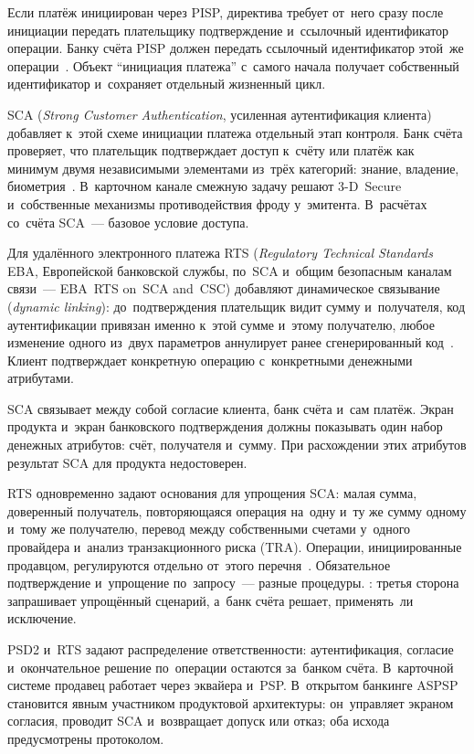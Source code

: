 Если платёж инициирован через PISP, директива требует от~него сразу после
инициации передать плательщику подтверждение и~ссылочный идентификатор операции.
Банку счёта PISP должен передать ссылочный идентификатор этой~же
операции~\cite{psd2}. Объект \enquote{инициация платежа} с~самого начала
получает собственный идентификатор и~сохраняет отдельный жизненный цикл.

SCA (\textit{Strong Customer Authentication}, усиленная аутентификация клиента)
добавляет к~этой схеме инициации платежа отдельный этап контроля. Банк
счёта проверяет, что плательщик подтверждает доступ к~счёту или платёж как
минимум двумя независимыми элементами из~трёх категорий: знание, владение,
биометрия~\cite{eba-rts-sca}. В~карточном канале смежную задачу решают
3-D~Secure и~собственные механизмы противодействия фроду у~эмитента.
В~расчётах со~счёта SCA~--- базовое условие доступа.

Для удалённого электронного платежа RTS (\textit{Regulatory Technical Standards}
  EBA, Европейской банковской службы, по~SCA и~общим безопасным каналам связи~---
EBA~RTS on~SCA and~CSC) добавляют динамическое связывание (\textit{dynamic
linking}): до~подтверждения плательщик видит сумму и~получателя,
код аутентификации привязан именно к~этой сумме и~этому получателю, любое
изменение одного из~двух параметров аннулирует ранее сгенерированный
код~\cite{eba-rts-sca}. Клиент подтверждает конкретную операцию
с~конкретными денежными атрибутами.

SCA связывает между собой согласие клиента, банк счёта и~сам платёж. Экран
продукта и~экран банковского подтверждения должны показывать один набор
денежных атрибутов: счёт, получателя и~сумму. При расхождении этих атрибутов
результат SCA для продукта недостоверен.

RTS одновременно задают основания для упрощения SCA: малая сумма, доверенный
получатель, повторяющаяся операция на~одну и~ту же сумму одному и~тому же
получателю, перевод между собственными счетами у~одного провайдера и~анализ
транзакционного риска (TRA). Операции, инициированные продавцом, регулируются
отдельно от~этого перечня~\cite{eba-rts-sca}. Обязательное подтверждение
и~упрощение по~запросу~--- разные процедуры. : третья сторона запрашивает упрощённый сценарий, а~банк счёта
решает, применять~ли исключение.

PSD2 и~RTS задают распределение ответственности: аутентификация, согласие
и~окончательное решение по~операции остаются за~банком счёта. В~карточной системе продавец
работает через эквайера и~PSP. В~открытом банкинге ASPSP становится явным
участником продуктовой архитектуры: он~управляет экраном согласия, проводит SCA
и~возвращает допуск или отказ; оба исхода предусмотрены протоколом.

